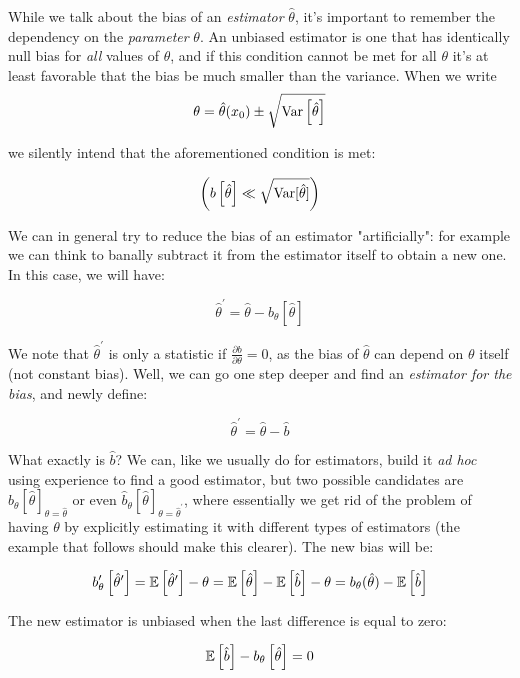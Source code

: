While we talk about the bias of an \emph{estimator} $\hat\theta$, it's important to remember the dependency on the \emph{parameter} $\theta$. An unbiased estimator is one that has identically null bias for \emph{all} values of $\theta$, and if this condition cannot be met for all $\theta$ it's at least favorable that the bias be much smaller than the variance. When we write
	\[
	\theta = \hat{\theta}(x_0) \pm \sqrt{\operatorname{Var}\left[\hat{\theta}\right]}
	\] 
	
we silently intend that the aforementioned condition is met:
	
	\[
	\left(b\left[\hat{\theta}\right]\ll\sqrt{\operatorname{Var}[\hat{\theta}]}\right)
	\]

We can in general try to reduce the bias of an estimator "artificially": for example we can think to banally subtract it from the estimator itself to obtain a new one. In this case, we will have:

	\[
	\hat\theta^\prime = \hat\theta - b_\theta\left[\hat\theta\right]
	\]

We note that $\hat\theta^\prime$ is only a statistic if $\frac{\partial b}{\partial \theta} = 0$, as the bias of $\hat\theta$ can depend on $\theta$ itself (not constant bias). Well, we can go one step deeper and find an \emph{estimator for the bias}, and newly define:

	\[
	\hat\theta^\prime = \hat\theta - \hat{b} 
	\]

What exactly is $\hat{b}$? We can, like we usually do for estimators, build it \emph{ad hoc} using experience to find a good estimator, but two possible candidates are $\hat{b}_\theta\left[\hat\theta\right]_{\theta=\hat{\theta}}$ or even $\hat{b}_\theta\left[\hat\theta\right]_{\theta=\hat{\theta}^\prime}$, where essentially we get rid of the problem of having $\theta$ by explicitly estimating it with different types of estimators (the example that follows should make this clearer).
The new bias will be:

	\[
	b_\theta^\prime\left[\hat\theta^\prime\right] = \mathbb{E}\left[\hat\theta^\prime\right] - \theta = \mathbb{E}\left[\hat\theta\right] - \mathbb{E}\left[\hat{b}\right] - \theta = b_\theta(\hat\theta) - \mathbb{E}\left[\hat{b}\right]
	\]

The new estimator is unbiased when the last difference is equal to zero:
	
	\[
	\mathbb{E}\left[\hat{b}\right] - b_\theta\left[\hat\theta\right] = 0 
	\]

